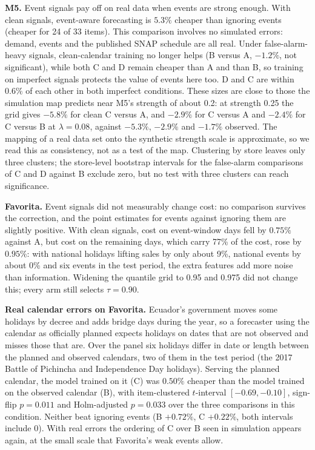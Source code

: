 \textbf{M5.} Event signals pay off on real data when events are strong enough. With clean signals, event-aware forecasting is $5.3\%$ cheaper than ignoring events (cheaper for 24 of 33 items). This comparison involves no simulated errors: demand, events and the published SNAP schedule are all real. Under false-alarm-heavy signals, clean-calendar training no longer helps (B versus A, $-1.2\%$, not significant), while both C and D remain cheaper than A and than B, so training on imperfect signals protects the value of events here too. D and C are within $0.6\%$ of each other in both imperfect conditions. These sizes are close to those the simulation map predicts near M5's strength of about 0.2: at strength 0.25 the grid gives $-5.8\%$ for clean C versus A, and $-2.9\%$ for C versus A and $-2.4\%$ for C versus B at $\lambda = 0.08$, against $-5.3\%$, $-2.9\%$ and $-1.7\%$ observed. The mapping of a real data set onto the synthetic strength scale is approximate, so we read this as consistency, not as a test of the map. Clustering by store leaves only three clusters; the store-level bootstrap intervals for the false-alarm comparisons of C and D against B exclude zero, but no test with three clusters can reach significance.

\textbf{Favorita.} Event signals did not measurably change cost: no comparison survives the correction, and the point estimates for events against ignoring them are slightly positive. With clean signals, cost on event-window days fell by $0.75\%$ against A, but cost on the remaining days, which carry 77\% of the cost, rose by $0.95\%$: with national holidays lifting sales by only about 9\%, national events by about 0\% and six events in the test period, the extra features add more noise than information. Widening the quantile grid to 0.95 and 0.975 did not change this; every arm still selects $\tau = 0.90$.

\textbf{Real calendar errors on Favorita.} Ecuador's government moves some holidays by decree and adds bridge days during the year, so a forecaster using the calendar as officially planned expects holidays on dates that are not observed and misses those that are. Over the panel six holidays differ in date or length between the planned and observed calendars, two of them in the test period (the 2017 Battle of Pichincha and Independence Day holidays). Serving the planned calendar, the model trained on it (C) was $0.50\%$ cheaper than the model trained on the observed calendar (B), with item-clustered $t$-interval $[-0.69, -0.10]$, sign-flip $p = 0.011$ and Holm-adjusted $p = 0.033$ over the three comparisons in this condition. Neither beat ignoring events (B $+0.72\%$, C $+0.22\%$, both intervals include 0). With real errors the ordering of C over B seen in simulation appears again, at the small scale that Favorita's weak events allow.


